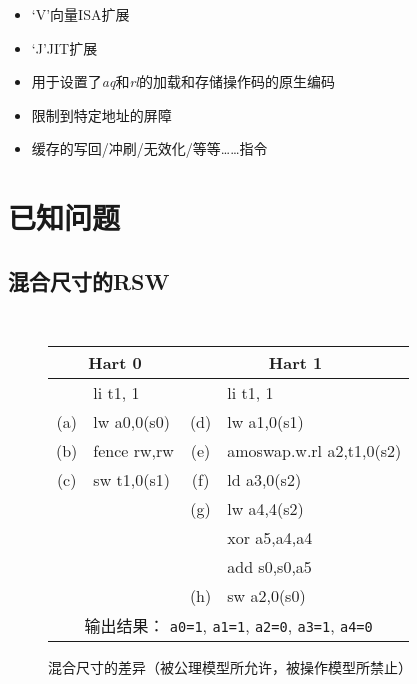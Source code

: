 \begin{itemize}
  \item ‘V’向量ISA扩展  
  \item ‘J’JIT扩展 
  \item 用于设置了{\em aq}和{\em rl}的加载和存储操作码的原生编码
  \item 限制到特定地址的屏障
  \item 缓存的写回/冲刷/无效化/等等……指令
\end{itemize}

\section{已知问题}
\label{sec:memory:discrepancies}

\subsection{混合尺寸的RSW}
\label{sec:memory:discrepancies:mixedrsw}

\begin{figure}[h!]
  \centering\small
  {\tt
    \begin{tabular}{cl||cl}
    \multicolumn{2}{c}{Hart 0} & \multicolumn{2}{c}{Hart 1} \\
    \hline
          & li t1, 1    &     & li t1, 1    \\
      (a) & lw a0,0(s0) & (d) & lw a1,0(s1) \\
      (b) & fence rw,rw & (e) & amoswap.w.rl a2,t1,0(s2) \\
      (c) & sw t1,0(s1) & (f) & ld a3,0(s2) \\
          &             & (g) & lw a4,4(s2) \\
          &             &     & xor a5,a4,a4  \\
          &             &     & add s0,s0,a5  \\
          &             & (h) & sw a2,0(s0)   \\
      \hline
      \multicolumn{4}{c}{输出结果： {\tt a0=1}, {\tt a1=1}, {\tt a2=0}, {\tt a3=1}, {\tt a4=0}}
    \end{tabular}
  }
  \caption{混合尺寸的差异（被公理模型所允许，被操作模型所禁止）
    }
  \label{fig:litmus:discrepancy:rsw1}
\end{figure}

